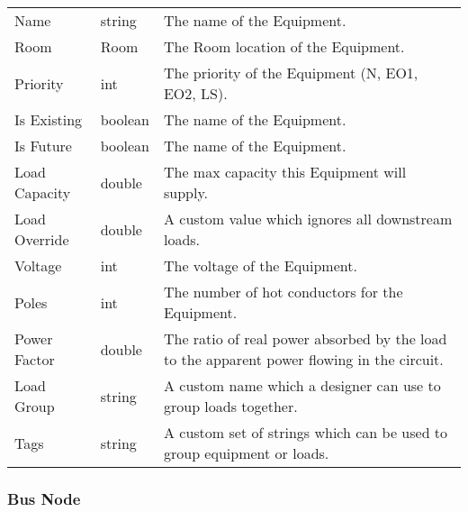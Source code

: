 \documentclass[letterpaper,10pt,english]{sphinxmanual}
\begin{document}
\begin{savenotes}\sphinxattablestart
\centering
\begin{tabulary}{\linewidth}[t]{|T|T|T|}
\hline
\sphinxstyletheadfamily 
{}
&\sphinxstyletheadfamily 
{}
&\sphinxstyletheadfamily 
{}
\\
\hline
Name
&
string
&
The name of the Equipment.
\\
\hline
Room
&
Room
&
The Room location of the Equipment.
\\
\hline
Priority
&
int
&
The priority of the Equipment (N, EO1, EO2, LS).
\\
\hline
Is Existing
&
boolean
&
The name of the Equipment.
\\
\hline
Is Future
&
boolean
&
The name of the Equipment.
\\
\hline
Load Capacity
&
double
&
The max capacity this Equipment will supply.
\\
\hline
Load Override
&
double
&
A custom value which ignores all downstream loads.
\\
\hline
Voltage
&
int
&
The voltage of the Equipment.
\\
\hline
Poles
&
int
&
The number of hot conductors for the Equipment.
\\
\hline
Power Factor
&
double
&
The ratio of real power absorbed by the load to the apparent power flowing in the circuit.
\\
\hline
Load Group
&
string
&
A custom name which a designer can use to group loads together.
\\
\hline
Tags
&
string
&
A custom set of strings which can be used to group equipment or loads.
\\
\hline
\end{tabulary}
\par
\sphinxattableend\end{savenotes}


\subsubsection{Bus Node}
\label{\detokenize{docs/definitions/index-definitions:bus-node}}\label{\detokenize{docs/definitions/index-definitions:bus-node-definition}}
\end{document}

